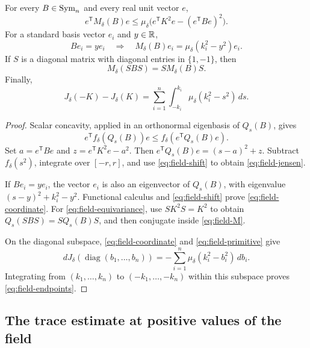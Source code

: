 \begin{lemma}\label{lem:field-properties}
For every $B\in\operatorname{Sym}_n$ and every real unit vector $e$,
\begin{equation}\label{eq:field-jensen}
 e^{\mathsf T}M_\delta(B)e
 \leq\mu_\delta\bigl(e^{\mathsf T}K^2e
                         -(e^{\mathsf T}Be)^2\bigr).
\end{equation}
For a standard basis vector $e_i$ and $y\in\mathbb R$,
\begin{equation}\label{eq:field-coordinate}
 Be_i=ye_i\quad\Longrightarrow\quad
 M_\delta(B)e_i=\mu_\delta(k_i^2-y^2)e_i.
\end{equation}
If $S$ is a diagonal matrix with diagonal entries in $\{1,-1\}$,
then
\begin{equation}\label{eq:field-equivariance}
 M_\delta(SBS)=S M_\delta(B)S.
\end{equation}
Finally,
\begin{equation}\label{eq:field-endpoints}
 J_\delta(-K)-J_\delta(K)
   =\sum_{i=1}^n\int_{-k_i}^{k_i}
                    \mu_\delta(k_i^2-s^2)\,ds.
\end{equation}
\end{lemma}

\begin{proof}
Scalar concavity, applied in an orthonormal eigenbasis of $Q_s(B)$,
gives
\[
 e^{\mathsf T}f_\delta(Q_s(B))e
      \leq f_\delta(e^{\mathsf T}Q_s(B)e).
\]
Set $a=e^{\mathsf T}Be$ and
$z=e^{\mathsf T}K^2e-a^2$.  Then
$e^{\mathsf T}Q_s(B)e=(s-a)^2+z$.
Subtract $f_\delta(s^2)$, integrate over $[-r,r]$, and use
\eqref{eq:field-shift} to obtain \eqref{eq:field-jensen}.

If $Be_i=ye_i$, the vector $e_i$ is also an eigenvector of $Q_s(B)$,
with eigenvalue $(s-y)^2+k_i^2-y^2$.  Functional calculus and
\eqref{eq:field-shift} prove \eqref{eq:field-coordinate}.
For \eqref{eq:field-equivariance}, use $SK^2S=K^2$ to obtain
$Q_s(SBS)=SQ_s(B)S$, and then conjugate inside
\eqref{eq:field-M}.

On the diagonal subspace, \eqref{eq:field-coordinate} and
\eqref{eq:field-primitive} give
\[
 dJ_\delta(\operatorname{diag}(b_1,\ldots,b_n))
       =-\sum_{i=1}^n\mu_\delta(k_i^2-b_i^2)\,db_i.
\]
Integrating from $(k_1,\ldots,k_n)$ to $(-k_1,\ldots,-k_n)$
within this subspace proves \eqref{eq:field-endpoints}.
\end{proof}

\subsection{The trace estimate at positive values of the field}


